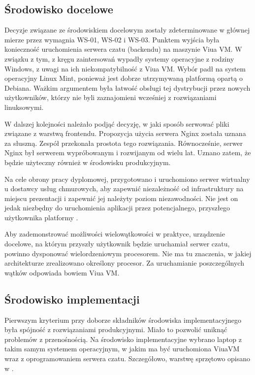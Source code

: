 \subsection{Środowisko docelowe}
Decyzje związane ze środowiskiem docelowym zostały zdeterminowane w głównej
mierze przez wymagnia WS-01, WS-02 i WS-03. Punktem wyjścia była konieczność
uruchomienia serwera czatu (backendu) na maszynie Viua VM. W związku z tym,
z kręgu zaintersowań wypadły systemy operacyjne z rodziny Windows, z uwagi na
ich niekompatybilność z Viua VM. Wybór padł na system operacyjny Linux Mint,
ponieważ jest dobrze utrzymywaną platformą opartą o Debiana. Ważkim argumentem
była łatwość obsługi tej dystrybucji przez nowych użytkowników, którzy nie byli zaznajomieni wcześniej z rozwiązaniami linuksowymi.

W dalszej kolejności należało podjąć decyzję, w jaki sposób serwować pliki
związane z warstwą frontendu. Propozycja użycia serwera Nginx została uznana
za słuszną. Zespół przekonała prostota tego rozwiązania. Równocześnie, serwer
Nginx był serwerem wypróbowanym i rozwijanym od wielu lat. Uznano zatem, że
będzie użyteczny również w środowisku produkcyjnym.

Na cele obrony pracy dyplomowej, przygotowano i uruchomiono serwer wirtualny u
dostawcy usług chmurowych, aby zapewnić niezależność od infrastruktury na
miejscu prezentacji i zapewnić jej należyty poziom niezawodności. Nie jest
on jedak niezbędny do uruchomienia aplikacji przez potencjalnego, przyszłego
użytkownika platformy \ViuAct.

Aby zademonstrować możliwości wielowątkowości w praktyce, urządzenie docelowe,
na którym przyszły użytkownik będzie uruchamiał serwer czatu, powinno dysponować
wielordzeniowym procesorem. Nie ma tu znaczenia, w jakiej architekturze
zrealizowano określony procesor. Za uruchamianie poszczególnych wątków odpowiada
bowiem Viua VM.

\subsection{Środowisko implementacji}
Pierwszym kryterium przy doborze składników środowiska implementacyjnego była
spójność z rozwiązaniami produkcyjnymi. Miało to pozwolić uniknąć problemów
z przenośnością. Na środowisko implementacyjne wybrano laptop z takim samym
systemem operacyjnym, w jakim ma być uruchomiona ViuaVM wraz z oprogramowaniem
serwera czatu. Szczegółowo, warstwę sprzętowo opisano w .

